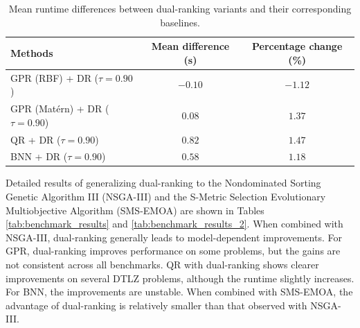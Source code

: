 \documentclass{article}
\begin{document}
\begin{table}[!htbp]
\caption{Mean runtime differences between dual-ranking variants and their corresponding baselines.}
\label{tab:runtime_diff}
\centering
\begin{tabular}{lcc}
\toprule
\textbf{Methods} & \textbf{Mean difference (s)} & \textbf{Percentage change (\%)} \\
\midrule
GPR (RBF) + DR ($\tau=0.90$) & $-0.10$ & $-1.12$ \\
GPR (Matérn) + DR ($\tau=0.90$) & $0.08$ & $1.37$ \\
QR + DR ($\tau=0.90$) & $0.82$ & $1.47$ \\
BNN + DR ($\tau=0.90$) & $0.58$ & $1.18$ \\
\bottomrule
\end{tabular}
\end{table}

Detailed results of generalizing dual-ranking to the Nondominated Sorting Genetic Algorithm III (NSGA-III) \cite{nsga3} and the S-Metric Selection Evolutionary Multiobjective Algorithm (SMS-EMOA) \cite{sms_emoa} are shown in Tables \ref{tab:benchmark_results} and \ref{tab:benchmark_results_2}. When combined with NSGA-III, dual-ranking generally leads to model-dependent improvements. For GPR, dual-ranking improves performance on some problems, but the gains are not consistent across all benchmarks. QR with dual-ranking shows clearer improvements on several DTLZ problems, although the runtime slightly increases. For BNN, the improvements are unstable. When combined with SMS-EMOA, the advantage of dual-ranking is relatively smaller than that observed with NSGA-III.
\end{document}
